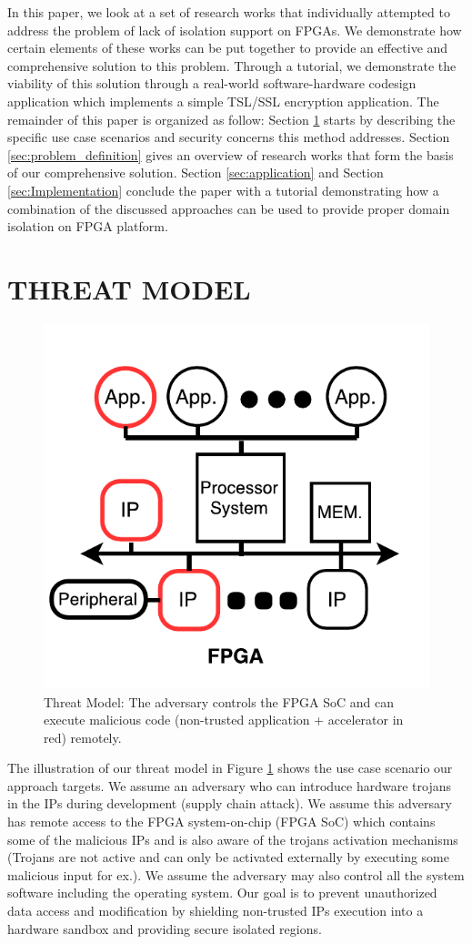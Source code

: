 \documentclass[sigconf]{acmart}
\theoremstyle{plain}
\theoremstyle{remark}
\begin{document}
In this paper, we look at a set of  research works that individually attempted to address the problem of lack of isolation support on FPGAs. We demonstrate how certain elements of these works can be put together to provide an effective and comprehensive solution to this problem. Through a tutorial, we demonstrate the viability of this solution through a real-world software-hardware codesign application which implements a simple TSL/SSL encryption application. The remainder of this paper is organized as follow: Section \ref{sec:threat_model} starts by describing the specific use case scenarios and security concerns this method addresses. Section \ref{sec:problem_definition} gives an overview of research works that form the basis of our comprehensive solution. Section \ref{sec:application} and Section \ref{sec:Implementation} conclude the paper with a tutorial demonstrating how a combination of the discussed approaches can be used to provide proper domain isolation on FPGA platform.


\section{THREAT MODEL} \label{sec:threat_model}

\begin{figure}[hbt]
\centering
\includegraphics[width=0.5\columnwidth]{figures/ThreatModel.pdf}
\caption{Threat Model: The adversary controls the FPGA SoC and can execute malicious code (non-trusted application + accelerator in red) remotely.}
\label{fig:threat}
\end{figure}

The illustration of our threat model in Figure \ref{fig:threat} shows the use case scenario our approach targets. We assume an adversary who can introduce hardware trojans in the IPs during development (supply chain attack). We assume this adversary has remote access to the FPGA system-on-chip (FPGA SoC) which contains some of the malicious IPs and is also aware of the trojans activation mechanisms (Trojans are not active and can only be activated externally by executing some malicious input for ex.). We assume the adversary may also control all the system software including the operating system. Our goal is to prevent unauthorized data access and modification by shielding non-trusted IPs execution into a hardware sandbox and providing secure isolated regions.
\end{document}
